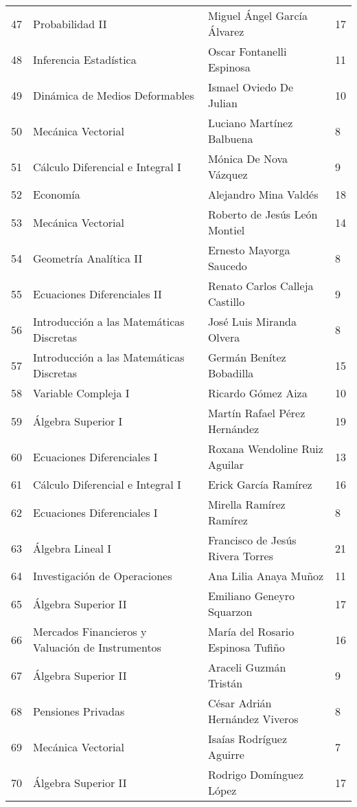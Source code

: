 \begin{table}[ht]
\begin{tabular}{rlll}
  47 & Probabilidad II & Miguel Ángel García Álvarez & 17 \\ 
  48 & Inferencia Estadística & Oscar Fontanelli Espinosa & 11 \\ 
  49 & Dinámica de Medios Deformables & Ismael Oviedo De Julian & 10 \\ 
  50 & Mecánica Vectorial & Luciano Martínez Balbuena & 8 \\ 
  51 & Cálculo Diferencial e Integral I & Mónica De Nova Vázquez & 9 \\ 
  52 & Economía & Alejandro Mina Valdés & 18 \\ 
  53 & Mecánica Vectorial & Roberto de Jesús León Montiel & 14 \\ 
  54 & Geometría Analítica II & Ernesto Mayorga Saucedo & 8 \\ 
  55 & Ecuaciones Diferenciales II & Renato Carlos Calleja Castillo & 9 \\ 
  56 & Introducción a las Matemáticas Discretas & José Luis Miranda Olvera & 8 \\ 
  57 & Introducción a las Matemáticas Discretas & Germán Benítez Bobadilla & 15 \\ 
  58 & Variable Compleja I & Ricardo Gómez Aiza & 10 \\ 
  59 & Álgebra Superior I & Martín Rafael Pérez Hernández & 19 \\ 
  60 & Ecuaciones Diferenciales I & Roxana Wendoline Ruiz Aguilar & 13 \\ 
  61 & Cálculo Diferencial e Integral I & Erick García Ramírez & 16 \\ 
  62 & Ecuaciones Diferenciales I & Mirella Ramírez Ramírez & 8 \\ 
  63 & Álgebra Lineal I & Francisco de Jesús Rivera Torres & 21 \\ 
  64 & Investigación de Operaciones & Ana Lilia Anaya Muñoz & 11 \\ 
  65 & Álgebra Superior II & Emiliano Geneyro Squarzon & 17 \\ 
  66 & Mercados Financieros y Valuación de Instrumentos & María del Rosario Espinosa Tufiño & 16 \\ 
  67 & Álgebra Superior II & Araceli Guzmán Tristán & 9 \\ 
  68 & Pensiones Privadas & César Adrián Hernández Viveros & 8 \\ 
  69 & Mecánica Vectorial & Isaías Rodríguez Aguirre & 7 \\ 
  70 & Álgebra Superior II & Rodrigo Domínguez López & 17 \\ 

\end{tabular}
\end{table}
